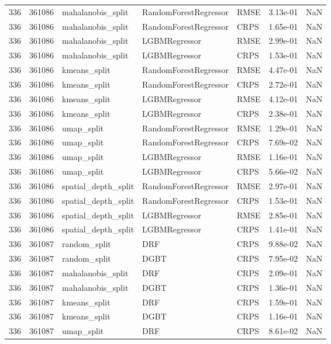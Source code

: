 \begin{tabular}{rrlllrr}
336 & 361086 & mahalanobis\_split & RandomForestRegressor & RMSE & 3.13e-01 & NaN \\
336 & 361086 & mahalanobis\_split & RandomForestRegressor & CRPS & 1.65e-01 & NaN \\
336 & 361086 & mahalanobis\_split & LGBMRegressor & RMSE & 2.99e-01 & NaN \\
336 & 361086 & mahalanobis\_split & LGBMRegressor & CRPS & 1.53e-01 & NaN \\
336 & 361086 & kmeans\_split & RandomForestRegressor & RMSE & 4.47e-01 & NaN \\
336 & 361086 & kmeans\_split & RandomForestRegressor & CRPS & 2.72e-01 & NaN \\
336 & 361086 & kmeans\_split & LGBMRegressor & RMSE & 4.12e-01 & NaN \\
336 & 361086 & kmeans\_split & LGBMRegressor & CRPS & 2.38e-01 & NaN \\
336 & 361086 & umap\_split & RandomForestRegressor & RMSE & 1.29e-01 & NaN \\
336 & 361086 & umap\_split & RandomForestRegressor & CRPS & 7.69e-02 & NaN \\
336 & 361086 & umap\_split & LGBMRegressor & RMSE & 1.16e-01 & NaN \\
336 & 361086 & umap\_split & LGBMRegressor & CRPS & 5.66e-02 & NaN \\
336 & 361086 & spatial\_depth\_split & RandomForestRegressor & RMSE & 2.97e-01 & NaN \\
336 & 361086 & spatial\_depth\_split & RandomForestRegressor & CRPS & 1.53e-01 & NaN \\
336 & 361086 & spatial\_depth\_split & LGBMRegressor & RMSE & 2.85e-01 & NaN \\
336 & 361086 & spatial\_depth\_split & LGBMRegressor & CRPS & 1.41e-01 & NaN \\
336 & 361087 & random\_split & DRF & CRPS & 9.88e-02 & NaN \\
336 & 361087 & random\_split & DGBT & CRPS & 7.95e-02 & NaN \\
336 & 361087 & mahalanobis\_split & DRF & CRPS & 2.09e-01 & NaN \\
336 & 361087 & mahalanobis\_split & DGBT & CRPS & 1.36e-01 & NaN \\
336 & 361087 & kmeans\_split & DRF & CRPS & 1.59e-01 & NaN \\
336 & 361087 & kmeans\_split & DGBT & CRPS & 1.16e-01 & NaN \\
336 & 361087 & umap\_split & DRF & CRPS & 8.61e-02 & NaN \\

\end{tabular}
